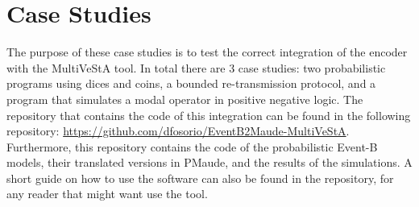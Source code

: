 \chapter{Case Studies}


The purpose of these case studies is to test the correct integration of the encoder with the MultiVeStA tool. In total there are 3 case studies: two probabilistic programs using dices and coins, a bounded re-transmission protocol, and a program that simulates a modal operator in positive negative logic. The repository that contains the code of this integration can be found in the following repository: \url{https://github.com/dfosorio/EventB2Maude-MultiVeStA}. Furthermore, this repository contains the code of the probabilistic Event-B models, their translated versions in PMaude, and the results of the simulations. A short guide on how to use the software can also be found in the repository, for any reader that might want use the tool.



